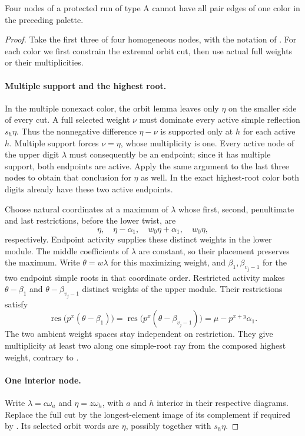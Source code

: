 \begin{proposition}\label{w:a-obstruction}
Four nodes of a protected run of type A cannot have all pair edges of one color in the preceding palette.
\end{proposition}
\begin{proof}
Take the first three of four homogeneous nodes, with the notation of
. For each color we first constrain the
extremal orbit cut, then use actual full weights or their multiplicities.

\paragraph{Multiple support and the highest root.}
In the multiple nonexact color, the orbit lemma leaves only $\eta$ on
the smaller side of every cut. A full selected weight $\nu$ must
dominate every active simple reflection $s_h\eta$. Thus the nonnegative
difference $\eta-\nu$ is supported only at $h$ for each active $h$.
Multiple support forces $\nu=\eta$, whose multiplicity is one. Every
active node of the upper digit $\lambda$ must consequently be an
endpoint; since it has multiple support, both endpoints are active.
Apply the same argument to the last three nodes to obtain that
conclusion for $\eta$ as well. In the exact highest-root color both
digits already have these two active endpoints.

Choose natural coordinates at a maximum of $\lambda$ whose first,
second, penultimate and last restrictions, before the lower twist, are
\[
 \eta,\quad \eta-\alpha_1,\quad
 w_0\eta+\alpha_1,\quad w_0\eta,
\]
respectively. Endpoint activity supplies these distinct weights in
the lower module. The middle coefficients of $\lambda$ are constant,
so their placement preserves the maximum. Write $\theta=w\lambda$
for this maximizing weight, and $\beta_1,\beta_{v_j-1}$ for the two
endpoint simple roots in that coordinate order. Restricted activity
makes $\theta-\beta_1$ and $\theta-\beta_{v_j-1}$ distinct weights of
the upper module. Their restrictions satisfy
\[
 \operatorname{res}\bigl(p^x(\theta-\beta_1)\bigr)
 =\operatorname{res}\bigl(p^x(\theta-\beta_{v_j-1})\bigr)
 =\mu-p^{x+y}\alpha_1.
\]
The two ambient weight spaces stay independent on restriction. They
give multiplicity at least two along one simple-root ray from the
composed highest weight, contrary to .

\paragraph{One interior node.}
Write $\lambda=c\omega_a$ and $\eta=z\omega_h$, with $a$ and $h$
interior in their respective diagrams. Replace the full cut by the
longest-element image of its complement if required by
. Its selected orbit words are $\eta$, possibly
together with $s_h\eta$.


\end{proof}
